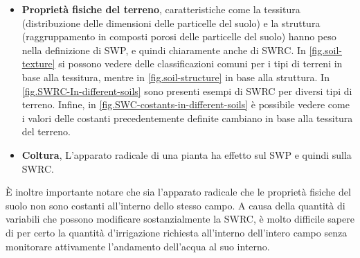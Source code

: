 \documentclass[12pt,a4paper,openright,twoside]{book}
\begin{document}
\begin{itemize}[noitemsep]
    \item \textbf{Proprietà fisiche del terreno}, caratteristiche come la tessitura (distribuzione delle dimensioni delle particelle del suolo) e la struttura (raggruppamento in composti porosi delle particelle del suolo) hanno peso nella definizione di \ac{SWP}, e quindi chiaramente anche di \ac{SWRC}\cite{jury1990soil}. In \cref{fig.soil-texture} si possono vedere delle classificazioni comuni per i tipi di terreni in base alla tessitura, mentre in \cref{fig.soil-structure} in base alla struttura. In \cref{fig.SWRC-In-different-soils} sono presenti esempi di \ac{SWRC} per diversi tipi di terreno. Infine, in \cref{fig.SWC-costants-in-different-soils} è possibile vedere come i valori delle costanti precedentemente definite cambiano in base alla tessitura del terreno.
    \item \textbf{Coltura}, L'apparato radicale di una pianta ha effetto sul \ac{SWP} e quindi sulla \ac{SWRC}\cite{XIAO2024167524}.
\end{itemize}

È inoltre importante notare che sia l'apparato radicale che le proprietà fisiche del suolo non sono costanti all'interno dello stesso campo. A causa della quantità di variabili che possono modificare sostanzialmente la \ac{SWRC}, è molto difficile sapere di per certo la quantità d'irrigazione richiesta all'interno dell'intero campo senza monitorare attivamente l'andamento dell'acqua al suo interno.
\end{document}
